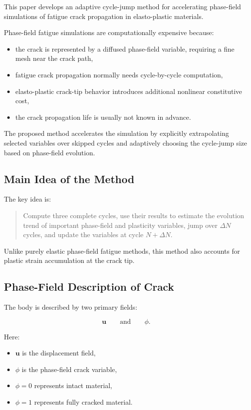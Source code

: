 ﻿\documentclass[11pt,a4paper]{article}
\begin{document}
This paper develops an adaptive cycle-jump method for accelerating phase-field simulations of fatigue crack propagation in elasto-plastic materials.

Phase-field fatigue simulations are computationally expensive because:

\begin{itemize}[leftmargin=*]
    \item the crack is represented by a diffused phase-field variable, requiring a fine mesh near the crack path,
    \item fatigue crack propagation normally needs cycle-by-cycle computation,
    \item elasto-plastic crack-tip behavior introduces additional nonlinear constitutive cost,
    \item the crack propagation life is usually not known in advance.
\end{itemize}

The proposed method accelerates the simulation by explicitly extrapolating selected variables over skipped cycles and adaptively choosing the cycle-jump size based on phase-field evolution.

\subsection{Main Idea of the Method}

The key idea is:

\begin{quote}
Compute three complete cycles, use their results to estimate the evolution trend of important phase-field and plasticity variables, jump over $\Delta N$ cycles, and update the variables at cycle $N+\Delta N$.
\end{quote}

Unlike purely elastic phase-field fatigue methods, this method also accounts for plastic strain accumulation at the crack tip.

\subsection{Phase-Field Description of Crack}

The body is described by two primary fields:

\[
\bm{u}
\qquad \text{and} \qquad
\phi.
\]

Here:

\begin{itemize}[leftmargin=*]
    \item $\bm{u}$ is the displacement field,
    \item $\phi$ is the phase-field crack variable,
    \item $\phi = 0$ represents intact material,
    \item $\phi = 1$ represents fully cracked material.
\end{itemize}
\end{document}
